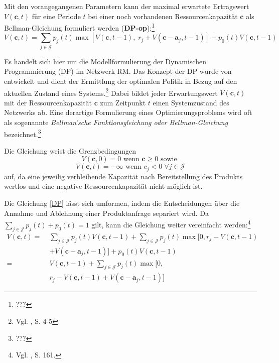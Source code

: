 Mit den vorangegangenen Parametern kann der maximal erwartete Ertragswert $V(\textbf{c},t)$ für eine Periode $t$ bei einer noch vorhandenen Ressourcenkapazität $\textbf{c}$ als Bellman-Gleichung formuliert werden (\textbf{DP-op}):\footnote{???}
\begin{equation}\label{DP}
V(\textbf{c},t)=\sum_{j\in\mathcal{J}}p_{j}(t)\max[ V(\textbf{c},t-1),\; r_{j}+V(\textbf{c}-\textbf{a}_{j},t-1)]+p_{0}(t)V(\textbf{c},t-1)
\end{equation}


Es handelt sich hier um die Modellformulierung der Dynamischen Programmierung (DP) im Netzwerk RM. Das Konzept der DP wurde von \citeauthor{bellman1954theory} entwickelt und dient der Ermittlung der optimalen Politik in Bezug auf den aktuellen Zustand eines Systems.\footnote{Vgl. \cite{bellman1954theory}, S. 4-5} Dabei bildet jeder Erwartungswert $V(\textbf{c},t)$ mit der Ressourcenkapazität $\textbf{c}$ zum Zeitpunkt $t$ einen Systemzustand des Netzwerks ab. Eine derartige Formulierung eines Optimierungsproblems wird oft als sogenannte \textit{Bellman'sche Funktionsgleichung oder Bellman-Gleichung} bezeichnet.\footnote{???}

Die Gleichung weist die Grenzbedingungen
\begin{equation}\label{GB1}
V(\textbf{c},0)=0 \text{ wenn } \textbf{c}\ge0 \text{ sowie }
\end{equation}
\begin{equation}\label{GB2}
V(\textbf{c},t)=-\infty \text{ wenn } c_{j}<0 \;\forall j\in\mathcal{J}
\end{equation}
auf, da eine jeweilig verbleibende Kapazität nach Bereitstellung des Produkts wertlos und eine negative Ressourcenkapazität nicht möglich ist. 

Die Gleichung \eqref{DP} lässt sich umformen, indem die Entscheidungen über die Annahme und Ablehnung einer Produktanfrage separiert wird. Da $\sum_{j\in \mathcal{J}}p_{j}(t)+p_{0}(t)=1$ gilt, kann die Gleichung weiter vereinfacht werden:\footnote{Vgl. \cite{Spengler:2007aa}, S. 161.}
\begin{equation}\label{DP2}
\begin{alignat*}{2}
V(\textbf{c},t)=\;& \sum_{j\in\mathcal{J}}p_{j}(t) V(\textbf{c},t-1)+ \sum_{j\in\mathcal{J}}p_{j}(t) \max[0,r_{j}-V(\textbf{c},t-1)\\
&+V(\textbf{c}-\textbf{a}_{j},t-1)]+p_{0}(t)V(\textbf{c},t-1)\\
=\;& V(\textbf{c},t-1) + \sum_{j\in\mathcal{J}}p_{j}(t) \max[0,\\
&  r_{j}-V(\textbf{c},t-1)+V(\textbf{c}-\textbf{a}_{j},t-1)]
\end{alignat*}
\end{equation}

